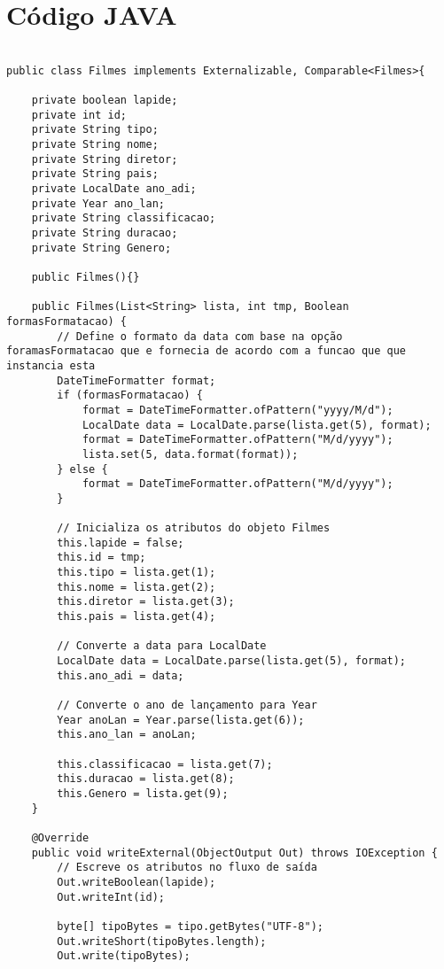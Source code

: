 \documentclass[12pt]{article}
\begin{document}
\section*{Código JAVA}
\begin{lstlisting}

public class Filmes implements Externalizable, Comparable<Filmes>{

    private boolean lapide;
    private int id;
    private String tipo;
    private String nome;
    private String diretor;
    private String pais;
    private LocalDate ano_adi;
    private Year ano_lan;
    private String classificacao;
    private String duracao;
    private String Genero;

    public Filmes(){}

    public Filmes(List<String> lista, int tmp, Boolean formasFormatacao) {
        // Define o formato da data com base na opção foramasFormatacao que e fornecia de acordo com a funcao que que instancia esta
        DateTimeFormatter format;
        if (formasFormatacao) {
            format = DateTimeFormatter.ofPattern("yyyy/M/d");
            LocalDate data = LocalDate.parse(lista.get(5), format);
            format = DateTimeFormatter.ofPattern("M/d/yyyy");
            lista.set(5, data.format(format));
        } else {
            format = DateTimeFormatter.ofPattern("M/d/yyyy");
        }
        
        // Inicializa os atributos do objeto Filmes
        this.lapide = false;
        this.id = tmp;
        this.tipo = lista.get(1);
        this.nome = lista.get(2);
        this.diretor = lista.get(3);
        this.pais = lista.get(4);
        
        // Converte a data para LocalDate
        LocalDate data = LocalDate.parse(lista.get(5), format);
        this.ano_adi = data;
        
        // Converte o ano de lançamento para Year
        Year anoLan = Year.parse(lista.get(6));
        this.ano_lan = anoLan;
        
        this.classificacao = lista.get(7);
        this.duracao = lista.get(8);
        this.Genero = lista.get(9);
    }
    
    @Override
    public void writeExternal(ObjectOutput Out) throws IOException {
        // Escreve os atributos no fluxo de saída
        Out.writeBoolean(lapide);
        Out.writeInt(id);
        
        byte[] tipoBytes = tipo.getBytes("UTF-8");
        Out.writeShort(tipoBytes.length);
        Out.write(tipoBytes);
        

\end{lstlisting}
\end{document}
